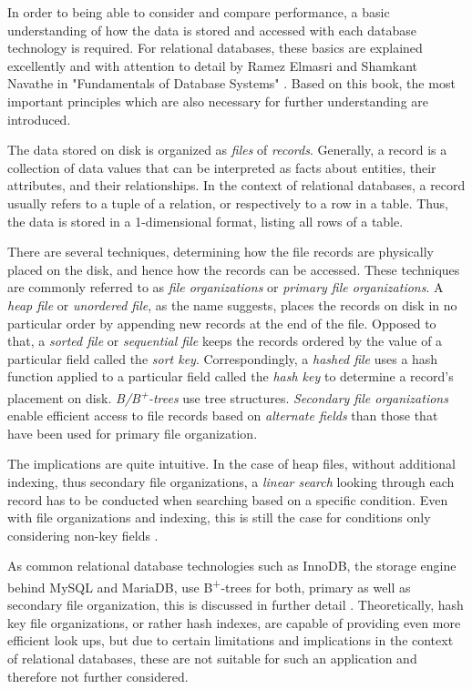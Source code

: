 In order to being able to consider and compare performance, a basic understanding of how the data is stored and accessed with each database technology is required. For relational databases, these basics are explained excellently and with attention to detail by Ramez Elmasri and Shamkant Navathe in "Fundamentals of Database Systems" \cite{DatabaseFundamentals}. Based on this book, the most important principles which are also necessary for further understanding are introduced.\par
The data stored on disk is organized as \emph{files} of \emph{records}. Generally, a record is a collection of data values that can be interpreted as facts about entities, their attributes, and their relationships. In the context of relational databases, a record usually refers to a tuple of a relation, or respectively to a row in a table. Thus, the data is stored in a 1-dimensional format, listing all rows of a table.\par
There are several techniques, determining how the file records are physically placed on the disk, and hence how the records can be accessed. These techniques are commonly referred to as \emph{file organizations} or \emph{primary file organizations}. A \emph{heap file} or \emph{unordered file}, as the name suggests, places the records on disk in no particular order by appending new records at the end of the file. Opposed to that, a \emph{sorted file} or \emph{sequential file} keeps the records ordered by the value of a particular field called the \emph{sort key}. Correspondingly, a \emph{hashed file} uses a hash function applied to a particular field called the \emph{hash key} to determine a record's placement on disk. \emph{B/B\textsuperscript{+}-trees} use tree structures. \emph{Secondary file organizations} enable efficient access to file records based on \emph{alternate fields} than those that have been used for primary file organization.\par
The implications are quite intuitive. In the case of heap files, without additional indexing, thus secondary file organizations, a \emph{linear search} looking through each record has to be conducted when searching based on a specific condition. Even with file organizations and indexing, this is still the case for conditions only considering non-key fields \cite{DatabaseFundamentals}.\par
As common relational database technologies such as InnoDB, the storage engine behind MySQL and MariaDB, use B\textsuperscript{+}-trees for both, primary as well as secondary file organization, this is discussed in further detail \cite{InnoDB}. Theoretically, hash key file organizations, or rather hash indexes, are capable of providing even more efficient look ups, but due to certain limitations and implications in the context of relational databases, these are not suitable for such an application and therefore not further considered.


